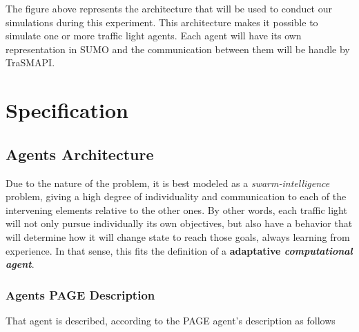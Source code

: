 \documentclass[10pt,a4paper]{article}
\begin{document}
	The figure above represents the architecture that will be used to conduct our simulations during this experiment. This architecture makes it possible to simulate one or more traffic light agents. Each agent will have its own representation in SUMO and the communication between them will be handle by TraSMAPI.
\newpage

\section{Specification}

\subsection{Agents Architecture}
	Due to the nature of the problem, it is best modeled as a \textit{swarm-intelligence} problem, giving a high degree of individuality and communication to each of the intervening elements relative to the other ones. By other words, each traffic light will not only pursue individually its own objectives, but also have a behavior that will determine how it will change state to reach those goals, always learning from experience. In that sense, this fits the definition of a \textbf{adaptative \textit{computational agent}}.\cite{Chin2013} 
    
\subsubsection{Agents PAGE Description}
    That agent is described, according to the PAGE agent's description as follows
    
\end{document}
